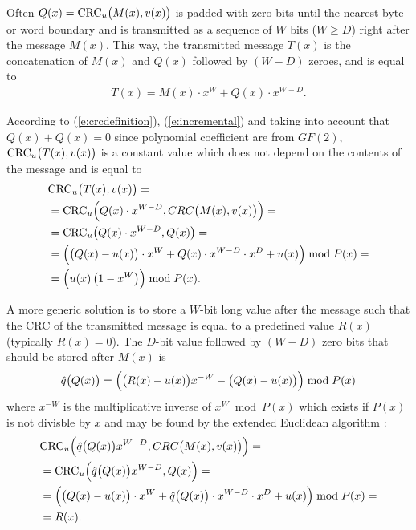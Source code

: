 \documentclass{article}
\begin{document}
Often $Q(x) = {\rm CRC}_u\bigl(M(x),v(x)\bigr)$ is padded with zero bits until the
nearest byte or word boundary and is transmitted as a sequence of $W$ bits
($W \geq D$) right after the message $M(x)$. This way, the transmitted
message $T(x)$ is the concatenation of $M(x)$ and $Q(x)$ followed by
$(W-D)$ zeroes, and is equal to
  \begin{align*}
    T(x) = M(x) \cdot x^W + Q(x) \cdot x^{W-D}.
  \end{align*}

According to (\ref{e:crcdefinition}), (\ref{e:incremental}) and taking into
account that $Q(x)+Q(x) = 0$ since polynomial coefficient are from $GF(2)$,
${\rm CRC}_u\bigl(T(x), v(x)\bigr)$ is a constant value which does not depend on
the contents of the message and is equal to
  \begin{align*}
    & {\rm CRC}_u\bigl(T(x), v(x)\bigr) = \\
    & = {\rm CRC}_u\Bigl(Q(x) \cdot x^{W-D}, CRC\bigl(M(x), v(x)\bigr)\Bigr) = \\
    & = {\rm CRC}_u\bigl(Q(x) \cdot x^{W-D}, Q(x)\bigr) = \\
    & = \Bigl(\bigl(Q(x)-u(x)\bigr) \cdot x^W + Q(x)\cdot x^{W-D} \cdot x^D + u(x)\Bigr)
        \bmod P(x) = \\
    & = \Bigl(u(x)\left(1 - x^W\right)\Bigr) \bmod P(x).
  \end{align*}

A more generic solution is to store a $W$-bit long value after the message
such that the CRC of the transmitted message is equal to a predefined value
$R(x)$ (typically $R(x)=0$). The $D$-bit value followed by $(W-D)$ zero
bits that should be stored after $M(x)$ is
  \begin{align*}
    \hat{q}\bigl(Q(x)\bigr) = \Bigl(\bigl(R(x) - u(x)\bigr) x^{-W} - \bigl(Q(x) - u(x)\bigr)\Bigr) \bmod P(x)
  \end{align*}
where $x^{-W}$ is the multiplicative inverse of $x^W \bmod P(x)$ which
exists if $P(x)$ is not divisble by $x$ and may be found by the extended
Euclidean algorithm \cite{Hasan01}:
  \begin{align*}
    & {\rm CRC}_u\Bigl(\hat{q}\bigl(Q(x)\bigr)x^{W-D}, CRC\bigl(M(x), v(x)\bigr)\Bigr) = \\
    & = {\rm CRC}_u\Bigl(\hat{q}\bigl(Q(x)\bigr)x^{W-D}, Q(x)\Bigr) = \\
    & = \Bigl(\bigl(Q(x)-u(x)\bigr) \cdot x^W + \hat{q}\bigl(Q(x)\bigr) \cdot x^{W-D} \cdot x^D + u(x)\Bigr)
          \bmod P(x) = \\
    & = R(x).
  \end{align*}
\end{document}
